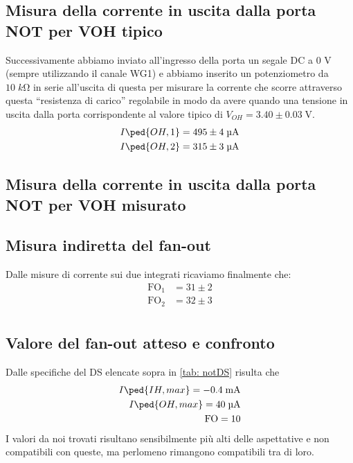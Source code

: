 \documentclass[10pt, a4paper, italian]{article}
\begin{document}
\subsection{Misura della corrente in uscita dalla porta NOT per VOH tipico}
Successivamente abbiamo inviato all'ingresso della porta un segale DC a 0 V
(sempre utilizzando il canale WG1) e abbiamo inserito un potenziometro da
$10 \; \si{k\ohm}$ in serie all'uscita di questa per misurare la corrente che
scorre attraverso questa ``resistenza di carico'' regolabile in modo da
avere quando una tensione in uscita dalla porta corrispondente al valore
tipico di $V_{OH}= 3.40 \pm 0.03 \; \si{\V}$.
\begin{align*}
    I\ped{OH, 1} &= 495 \pm 4 \; \si{\micro\A} \\
    I\ped{OH, 2} &= 315 \pm 3 \; \si{\micro\A} \\   
\end{align*}

\subsection{Misura della corrente in uscita dalla porta NOT per VOH misurato}

\subsection{Misura indiretta del fan-out}
Dalle misure di corrente sui due integrati ricaviamo finalmente che:
\begin{align*}
    \text{FO}_1 &= 31 \pm 2 \\
    \text{FO}_2 &= 32 \pm 3 \\
\end{align*}

\subsection{Valore del fan-out atteso e confronto}
Dalle specifiche del DS elencate sopra in \ref{tab: notDS} risulta che
\begin{align*}
    I\ped{IH, max}= -0.4 \; \si{m\A} \\
    I\ped{OH, max}= 40 \; \si{\micro\A} \\
    \text{FO} = 10
\end{align*}
I valori da noi trovati risultano sensibilmente più alti delle aspettative
e non compatibili con queste, ma perlomeno rimangono compatibili tra di loro.
\end{document}

